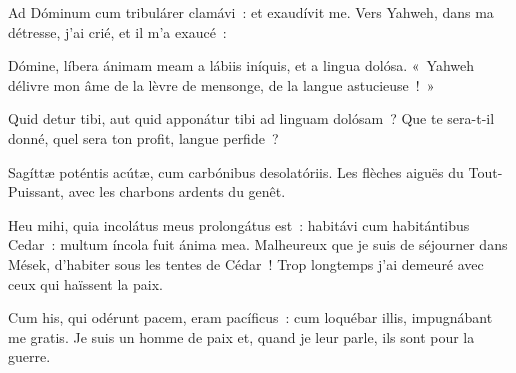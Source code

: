 
\begin{paracol}{2}

\LigneParacol{0cm}
{Ad Dóminum cum tribulárer clamávi~: \GreStar{} et exaudívit me.}
{Vers Yahweh, dans ma détresse, j'ai crié, et il m'a exaucé~:}

\LigneParacol{0.2cm}
{Dómine, líbera ánimam meam a lábiis iníquis, \GreStar{} et a lingua dolósa.}
{«~Yahweh délivre mon âme de la lèvre de mensonge, de la langue astucieuse~!~»}

\LigneParacol{0.2cm}
{Quid detur tibi, aut quid apponátur tibi \GreStar{} ad linguam dolósam~?}
{Que te sera-t-il donné, quel sera ton profit, langue perfide~?}

\LigneParacol{0.2cm}
{Sagíttæ poténtis acútæ, \GreStar{} cum carbónibus desolatóriis.}
{Les flèches aiguës du Tout-Puissant, avec les charbons ardents du genêt.}

\LigneParacol{0.2cm}
{Heu mihi, quia incolátus meus prolongátus est~: habitávi cum habitántibus Cedar~: \GreStar{} multum íncola fuit ánima mea.}
{Malheureux que je suis de séjourner dans Mések, d'habiter sous les tentes de Cédar~! Trop longtemps j'ai demeuré avec ceux qui haïssent la paix.}

\LigneParacol{0.2cm}
{Cum his, qui odérunt pacem, eram pacíficus~: \GreStar{} cum loquébar illis, impugnábant me gratis.}
{Je suis un homme de paix et, quand je leur parle, ils sont pour la guerre.}

\end{paracol}
\Gloria
{}
